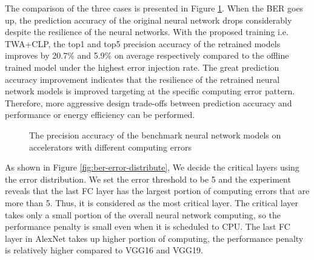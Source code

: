 The comparison of the three cases is presented in Figure \ref{fig:softerror-accuracy}.
When the BER goes up, the prediction accuracy of the original neural network drops 
considerably despite the resilience of the neural networks. 
With the proposed training i.e. TWA+CLP, the top1 and top5 precision accuracy 
of the retrained models improves by 20.7\% and 5.9\% on average respectively 
compared to the offline trained model under the highest error injection rate. 
The great prediction accuracy improvement indicates that the resilience 
of the retrained neural network models is improved targeting at the 
specific computing error pattern. Therefore, more aggressive design trade-offs 
between prediction accuracy and performance or energy efficiency can be performed. 
\begin{figure}
        \center
        \qquad
        \qquad
        \caption{The precision accuracy of the benchmark neural network models on accelerators with different computing errors}
        \label{fig:softerror-accuracy}
\end{figure}

As shown in Figure \ref{fig:ber-error-distribute},
We decide the critical layers using the error distribution. %
We set the error threshold to be 5 and the experiment reveals that the last FC 
layer has the largest portion of computing errors that are more than 5. Thus, it is considered as 
the most critical layer. The critical layer takes only a small portion of the overall 
neural network computing, so the performance penalty is small even 
when it is scheduled to CPU. The last FC layer in AlexNet takes up higher portion of computing, 
the performance penalty is relatively higher compared to VGG16 and VGG19.
\begin{figure*}
        \caption{Error distribution across the neural network layers when highest BER is used in AlexNet, VGG16 and VGG19.}
        \label{fig:ber-error-distribute}
\end{figure*}

